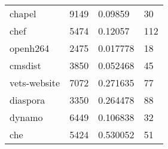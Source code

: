 \begin{table*}[]
\begin{tabular}{llll}
chapel                          & 9149                               & 0.09859                                                                                                           & 30                                                                                                            \\
chef                                   & 5474                               & 0.12057                                                                                                           & 112                                                                                                           \\
openh264                              & 2475                               & 0.017778                                                                                                          & 18                                                                                                            \\
cmsdist                              & 3850                               & 0.052468                                                                                                          & 45                                                                                                            \\
vets-website & 7072                               & 0.271635                                                                                                          & 77                                                                                                            \\
diaspora                           & 3350                               & 0.264478                                                                                                          & 88                                                                                                            \\
dynamo                             & 6449                               & 0.106838                                                                                                          & 32                                                                                                            \\
che                                 & 5424                               & 0.530052                                                                                                          & 51                                                                                                            \\

\end{tabular}
\end{table*}

